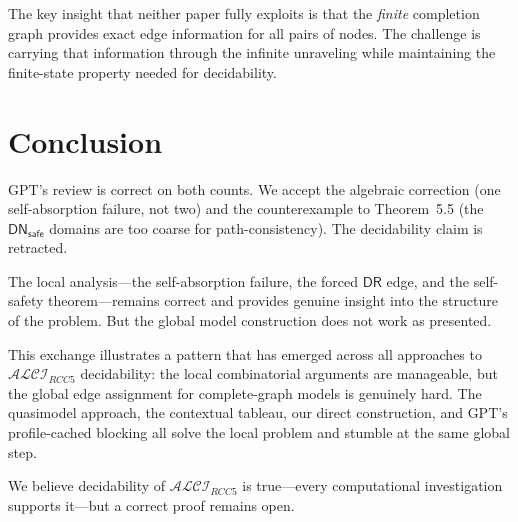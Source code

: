 \documentclass[a4paper,11pt]{article}
\theoremstyle{definition}
\newcommand{\ALCIRCC}[1]{\ensuremath{\mathcal{ALCI}_{\mathit{RCC#1}}}}
\newcommand{\DR}{\ensuremath{\mathsf{DR}}}
\newcommand{\DNsafe}{\ensuremath{\mathsf{DN}_{\mathsf{safe}}}}
\begin{document}
The key insight that neither paper fully exploits is that the
\emph{finite} completion graph provides exact edge information for all
pairs of nodes.  The challenge is carrying that information through
the infinite unraveling while maintaining the finite-state property
needed for decidability.


\section{Conclusion}

GPT's review is correct on both counts.  We accept the algebraic
correction (one self-absorption failure, not two) and the
counterexample to Theorem~5.5 (the $\DNsafe$ domains are too coarse
for path-consistency).  The decidability claim is retracted.

The local analysis---the self-absorption failure, the forced $\DR$
edge, and the self-safety theorem---remains correct and provides
genuine insight into the structure of the problem.  But the global
model construction does not work as presented.

This exchange illustrates a pattern that has emerged across all
approaches to $\ALCIRCC{5}$ decidability: the local combinatorial
arguments are manageable, but the global edge assignment for
complete-graph models is genuinely hard.  The quasimodel approach, the
contextual tableau, our direct construction, and GPT's profile-cached
blocking all solve the local problem and stumble at the same global
step.

We believe decidability of $\ALCIRCC{5}$ is true---every
computational investigation supports it---but a correct proof
remains open.
\end{document}
